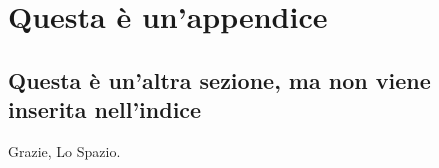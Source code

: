 \chapter{Questa è un'appendice}

\lipsum[5]

\section*{Questa è un'altra sezione, ma non viene inserita nell'indice}

\lipsum[6] Grazie, Lo Spazio.
